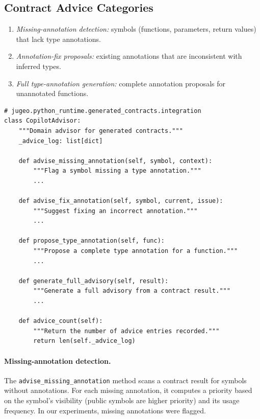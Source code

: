 \documentclass[11pt]{article}
\begin{document}
\subsection{Contract Advice Categories}\label{sec:contract-categories}

\begin{definition}\label{def:contract-cat}
\begin{enumerate}
  \item \emph{Missing-annotation detection:} symbols (functions,
    parameters, return values) that lack type annotations.
  \item \emph{Annotation-fix proposals:} existing annotations that
    are inconsistent with inferred types.
  \item \emph{Full type-annotation generation:} complete annotation
    proposals for unannotated functions.
\end{enumerate}
\end{definition}

\begin{lstlisting}[style=jugeo-python, caption={$\mathsf{CopilotAdvisor}$ for generated contracts.}, label={lst:contract-advisor}]
# jugeo.python_runtime.generated_contracts.integration
class CopilotAdvisor:
    """Domain advisor for generated contracts."""
    _advice_log: list[dict]

    def advise_missing_annotation(self, symbol, context):
        """Flag a symbol missing a type annotation."""
        ...

    def advise_fix_annotation(self, symbol, current, issue):
        """Suggest fixing an incorrect annotation."""
        ...

    def propose_type_annotation(self, func):
        """Propose a complete type annotation for a function."""
        ...

    def generate_full_advisory(self, result):
        """Generate a full advisory from a contract result."""
        ...

    def advice_count(self):
        """Return the number of advice entries recorded."""
        return len(self._advice_log)
\end{lstlisting}

\paragraph{Missing-annotation detection.}
The \texttt{advise\_missing\_annotation} method scans a contract result
for symbols without annotations.  For each missing annotation, it
computes a priority based on the symbol's visibility (public symbols
are higher priority) and its usage frequency.  In our experiments,
\ppXCcontractMissingAnnotations{} missing annotations were flagged.
\end{document}
